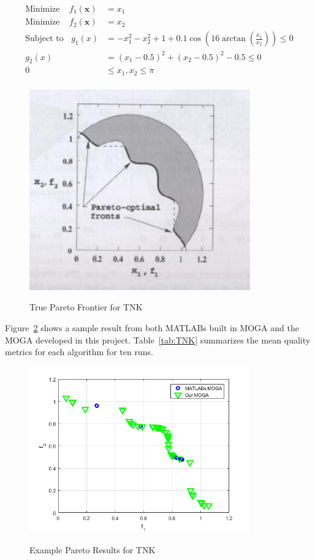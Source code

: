 \documentclass{article}
\begin{document}
\begin{align*}
\textrm{Minimize} ~~~~~ f_1(\textbf{x}) &= x_1 \\
\textrm{Minimize} ~~~~~ f_2(\textbf{x}) &= x_2 \\
\textrm{Subject to} ~~~~ g_1(x) &= -x_1^2-x_2^2+1+0.1\cos(16\arctan(\frac{x_1}{x_2})) \leq 0 \\
g_2(x) &= (x_1 - 0.5)^2 + (x_2 - 0.5)^2 -0.5 \leq 0 \\
0 &\leq  x_1,x_2 \leq \pi \\
\end{align*}
\begin{figure}[h]
  \caption{True Pareto Frontier for TNK}
  \centering
  \includegraphics[width=0.85\textwidth]{TNK_pareto_true.png}  
  \label{fig:TNK_true}
\end{figure}


Figure~\ref{fig:TNK} shows a sample result from both MATLABs built in MOGA and the MOGA developed in this project. Table~\ref{tab:TNK} summarizes the mean quality metrics for each algorithm for ten runs.
\begin{figure}[h]
  \caption{Example Pareto Results for TNK}
  \centering
  \includegraphics[width=0.85\textwidth]{TNK_pareto_final.png}  
  \label{fig:TNK}
\end{figure}
\end{document}
